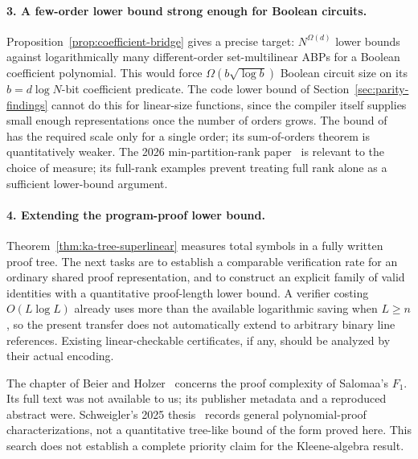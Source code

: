 \documentclass[11pt]{article}
\theoremstyle{definition}
\theoremstyle{remark}
\begin{document}
\paragraph{3. A few-order lower bound strong enough for Boolean circuits.}
Proposition~\ref{prop:coefficient-bridge} gives a precise target:
$N^{\Omega(d)}$ lower bounds against logarithmically many
different-order set-multilinear ABPs for a Boolean coefficient
polynomial. This would force
$\Omega(b\sqrt{\log b})$ Boolean circuit size on its
$b=d\log N$-bit coefficient predicate. The code lower bound of
Section~\ref{sec:parity-findings} cannot do this for linear-size
functions, since the compiler itself supplies small enough
representations once the number of orders grows.
The bound of~\cite{CKSS24} has the required scale only
for a single order; its sum-of-orders theorem is quantitatively weaker.
The 2026 min-partition-rank paper~\cite{FLSY26} is relevant to the
choice of measure; its full-rank examples prevent treating full rank
alone as a sufficient lower-bound argument.

\paragraph{4. Extending the program-proof lower bound.}
Theorem~\ref{thm:ka-tree-superlinear} measures total symbols in a
fully written proof tree. The next tasks are to establish a comparable
verification rate for an ordinary shared proof representation, and to
construct an explicit family of valid identities with a quantitative
proof-length lower bound. A verifier costing $O(L\log L)$ already
uses more than the available logarithmic saving when $L\ge n$, so
the present transfer does not automatically extend to
arbitrary binary line references. Existing linear-checkable
certificates, if any, should be analyzed by their actual encoding.

The chapter of Beier and Holzer~\cite{BH24} concerns the proof
complexity of Salomaa's $F_1$. Its full text was not available to us;
its publisher metadata and a reproduced abstract were. Schweigler's
2025 thesis~\cite[Section~5, pp.~29--31]{Sch25} records general
polynomial-proof characterizations, not a quantitative tree-like
bound of the form proved here. This search does not establish a
complete priority claim for the Kleene-algebra result.
\end{document}

